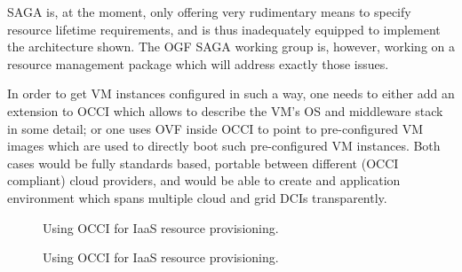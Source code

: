 \documentclass[10pt,conference,final,letterpaper,twoside,twocolumn,]{IEEEtran}
\begin{document}
 SAGA is, at the moment, only offering very rudimentary means to
 specify resource lifetime requirements, and is thus inadequately
 equipped to implement the architecture shown.  The OGF SAGA working
 group is, however, working on a resource management package which
 will address exactly those issues.

 In order to get VM instances configured in  such a way, one needs to
 either add an extension to OCCI which allows to describe the VM's OS
 and middleware stack in some detail; or one uses OVF inside OCCI to
 point to pre-configured VM images which are used to directly boot
 such pre-configured VM instances.  Both cases would be fully
 standards based, portable between different (OCCI compliant) cloud
 providers, and would be able to create and application environment
 which spans multiple cloud and grid DCIs transparently.

\begin{figure}[htb]
 \caption{\label{fig:arch2} Using OCCI for IaaS resource provisioning.}
\end{figure}


\begin{figure}[htb]
 \caption{\label{fig:arch2} Using OCCI for IaaS resource provisioning.}
\end{figure}
\end{document}
